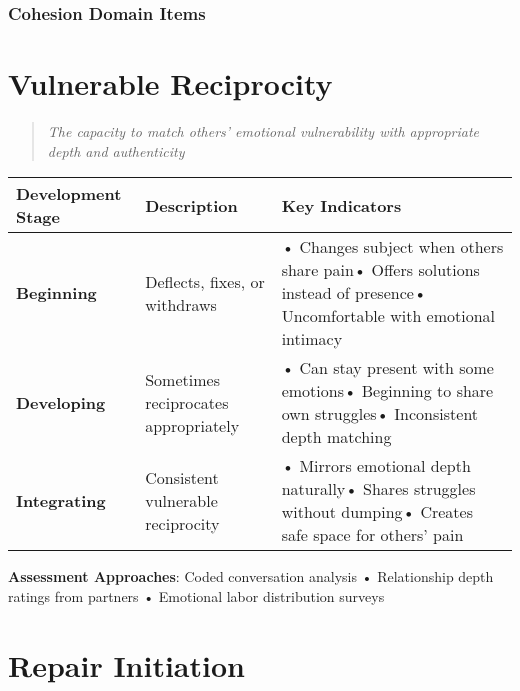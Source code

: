 \documentclass[
  a4paper,
]{report}
\begin{document}
\subsubsection{Cohesion Domain Items}\label{cohesion-domain-items}

\section{Vulnerable Reciprocity}

\begin{quote}
\emph{The capacity to match others' emotional vulnerability with
appropriate depth and authenticity}
\end{quote}

\begin{longtable}[]{@{}
  >{\raggedright\arraybackslash}p{}
  >{\raggedright\arraybackslash}p{}
  >{\raggedright\arraybackslash}p{}@{}}
\toprule\noalign{}
\begin{minipage}[b]{\linewidth}\raggedright
Development Stage
\end{minipage} & \begin{minipage}[b]{\linewidth}\raggedright
Description
\end{minipage} & \begin{minipage}[b]{\linewidth}\raggedright
Key Indicators
\end{minipage} \\
\midrule\noalign{}
\endhead
\bottomrule\noalign{}
\endlastfoot
\textbf{Beginning} & Deflects, fixes, or withdraws & • Changes subject
when others share pain• Offers solutions instead of presence•
Uncomfortable with emotional intimacy \\
\textbf{Developing} & Sometimes reciprocates appropriately & • Can stay
present with some emotions• Beginning to share own struggles•
Inconsistent depth matching \\
\textbf{Integrating} & Consistent vulnerable reciprocity & • Mirrors
emotional depth naturally• Shares struggles without dumping• Creates
safe space for others' pain \\
\end{longtable}

\textbf{Assessment Approaches}: Coded conversation analysis •
Relationship depth ratings from partners • Emotional labor distribution
surveys

\section{Repair Initiation}
\end{document}
